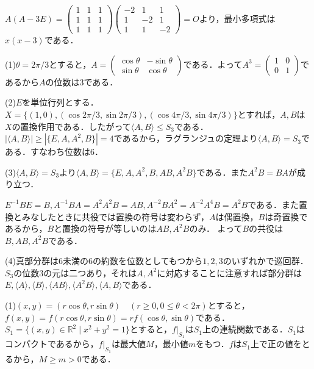\documentclass[
		book,
		head_space=20mm,
		foot_space=20mm,
		gutter=10mm,
		line_length=190mm
]{jlreq}
\begin{document}
$A(A-3E)=\begin{pmatrix}
    1 & 1 & 1\\
    1 & 1 & 1\\
    1 & 1 & 1
\end{pmatrix}\begin{pmatrix}
    -2 & 1 & 1\\
    1 & -2 & 1\\
    1 & 1 & -2
\end{pmatrix}=O$より，最小多項式は$x(x-3)$である．

(1)$\theta=2\pi/3$とすると，$A=\begin{pmatrix}
    \cos \theta & -\sin \theta\\
    \sin \theta & \cos \theta
    \end{pmatrix}$である．よって$A^3=\begin{pmatrix}
        1 & 0\\
        0 & 1
    \end{pmatrix}$であるから$A$の位数は$3$である．

(2)$E$を単位行列とする．
$X=\{ (1,0), (\cos 2\pi/3, \sin 2\pi/3), (\cos 4\pi/3, \sin 4\pi/3) \}$とすれば，$A,B$は$X$の置換作用である．したがって$\langle A,B \rangle \le S_3$である．$|\langle A,B\rangle|\ge| \{ E,A,A^2,B\}|=4$であるから，ラグランジュの定理より$\langle A,B \rangle =S_3$である．すなわち位数は$6$．

(3)$\langle A,B \rangle =S_3$より$\langle A,B \rangle =\{ E,A,A^2,B,AB,A^2B \}$である．また$A^2B=BA$が成り立つ．

$E^{-1}BE=B,A^{-1}BA=A^2A^2B=AB,A^{-2}BA^2=A^{-2}A^4B=A^2B$である．また置換とみなしたときに共役では置換の符号は変わらず，$A$は偶置換，$B$は奇置換であるから，$B$と置換の符号が等しいのは$AB,A^2B$のみ．
よって$B$の共役は$ B ,AB ,A^2B$である．

(4)真部分群は$6$未満の$6$の約数を位数としてもつから$1,2,3$のいずれかで巡回群．
$S_3$の位数$3$の元は二つあり，それは$A,A^2$に対応することに注意すれば部分群は$ {E}, \langle A \rangle, \langle B \rangle,  \langle AB \rangle, \langle A^2B \rangle ,\langle A,B \rangle$である．

(1)$(x,y)=(r\cos \theta, r\sin \theta)\quad (r\ge 0,0\le \theta < 2\pi)$とすると，$f(x,y)=f(r\cos\theta, r\sin\theta)=rf(\cos \theta,\sin \theta)$である．
$S_1=\{ (x,y)\in \mathbb{R}^2 \mid x^2+y^2=1 \}$とすると，$f|_{S_1}$は$S_1$上の連続関数である．$S_1$はコンパクトであるから，$f|_{S_1}$は最大値$M$，最小値$m$をもつ．$f$は$S_1$上で正の値をとるから，$M\ge m>0$である．
\end{document}
